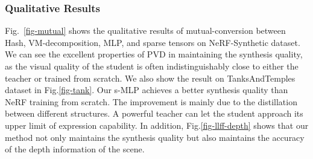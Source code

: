 \documentclass[letterpaper]{article} \usepackage{aaai23}  \usepackage{times}  \usepackage{helvet}  \usepackage{courier}  \usepackage[hyphens]{url}  \usepackage{graphicx} \urlstyle{rm} \def\UrlFont{\rm}  \usepackage{natbib}  \usepackage{caption} \frenchspacing  \setlength{\pdfpagewidth}{8.5in}  \setlength{\pdfpageheight}{11in}  \usepackage{multirow}
\begin{document}
\subsubsection{Qualitative Results} Fig.~\ref{fig-mutual} shows the qualitative results of mutual-conversion between Hash, VM-decomposition, MLP, and sparse tensors on NeRF-Synthetic dataset. We can see the excellent properties of PVD in maintaining the synthesis quality, as the visual quality of the student is often indistinguishably close to either the teacher or trained from scratch. We also show the result on TanksAndTemples dataset in Fig.\ref{fig-tank}. Our s-MLP achieves a better synthesis quality than NeRF training from scratch. The improvement is mainly due to the distillation between different structures. A powerful teacher can let the student approach its upper limit of expression capability. In addition, Fig.\ref{fig-llff-depth} shows that our method not only maintains the synthesis quality but also maintains the accuracy of the depth information of the scene.



\begin{table}[h]
\caption{An ablation study of our method. Metrics are averaged over the 8 scenes from  NeRF-Synthetic dataset in the conversion from VM-decomposition to s-MLP.}
\label{table-loss-ablation}
\end{table}
\end{document}
